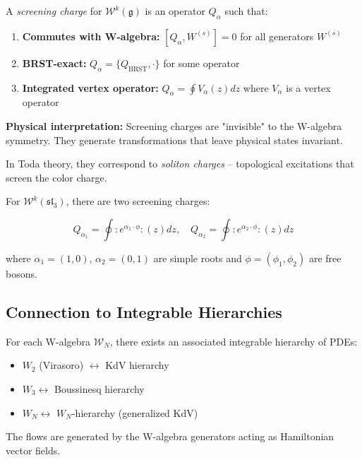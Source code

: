 \begin{definition}
\label{def:screening-detailed}
A \emph{screening charge} for $\mathcal{W}^k(\mathfrak{g})$ is an operator 
$Q_\alpha$ such that:
\begin{enumerate}
\item \textbf{Commutes with W-algebra:} $[Q_\alpha, W^{(s)}] = 0$ for all generators $W^{(s)}$
\item \textbf{BRST-exact:} $Q_\alpha = \{Q_{\text{BRST}}, \cdot\}$ for some operator
\item \textbf{Integrated vertex operator:} $Q_\alpha = \oint V_\alpha(z) dz$ where 
$V_\alpha$ is a vertex operator
\end{enumerate}

\textbf{Physical interpretation:} Screening charges are "invisible" to the W-algebra 
symmetry. They generate transformations that leave physical states invariant.

In Toda theory, they correspond to \emph{soliton charges} -- topological excitations 
that screen the color charge.
\end{definition}

\begin{example}
\label{ex:w3-screening-explicit}
For $\mathcal{W}^k(\mathfrak{sl}_3)$, there are two screening charges:

$$Q_{\alpha_1} = \oint :e^{\alpha_1 \cdot \phi}:(z) dz, \quad 
Q_{\alpha_2} = \oint :e^{\alpha_2 \cdot \phi}:(z) dz$$

where $\alpha_1 = (1,0)$, $\alpha_2 = (0,1)$ are simple roots and 
$\phi = (\phi_1, \phi_2)$ are free bosons.
\end{example}

\subsection{Connection to Integrable Hierarchies}

\begin{theorem}
\label{thm:w-algebras-integrable}
For each W-algebra $\mathcal{W}_N$, there exists an associated integrable hierarchy 
of PDEs:
\begin{itemize}
\item $W_2$ (Virasoro) $\longleftrightarrow$ KdV hierarchy
\item $W_3 \longleftrightarrow$ Boussinesq hierarchy
\item $W_N \longleftrightarrow$ $W_N$-hierarchy (generalized KdV)
\end{itemize}

The flows are generated by the W-algebra generators acting as Hamiltonian vector fields.
\end{theorem}

